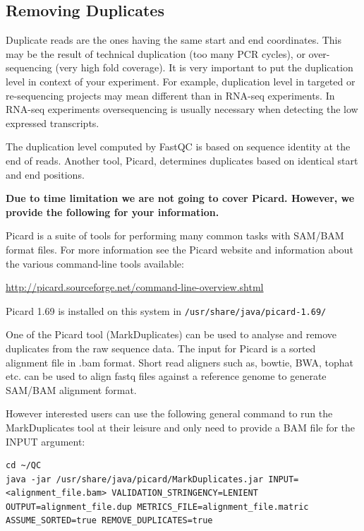 \begin{advanced}
\subsection{Removing Duplicates}
Duplicate reads are the ones having the same start and end coordinates. This
may be the result of technical duplication (too many PCR cycles), or
over-sequencing (very high fold coverage). It is very important to put the
duplication level in context of your experiment. For example, duplication level
in targeted or re-sequencing projects may mean different than in RNA-seq
experiments. In RNA-seq experiments oversequencing is usually necessary when
detecting the low expressed transcripts.

\begin{information}
The duplication level computed by FastQC is based on sequence identity at the
end of reads. Another tool, Picard, determines duplicates based on identical
start and end positions.

\textbf{Due to time limitation we are not going to cover Picard. However, we
provide the following for your information.}

Picard is a suite of tools for performing many common tasks with SAM/BAM format
files. For more information see the Picard website and information about the
various command-line tools available:

\url{http://picard.sourceforge.net/command-line-overview.shtml}
\end{information}

\begin{information}
Picard 1.69 is installed on this system in \texttt{/usr/share/java/picard-1.69/}

One of the Picard tool (MarkDuplicates) can be used to analyse and remove
duplicates from the raw sequence data. The input for Picard is a sorted
alignment file in .bam format. Short read aligners such as, bowtie, BWA, tophat
etc. can be used to align fastq files against a reference genome to generate
SAM/BAM alignment format.
\end{information}

\begin{steps}
However interested users can use the following general command to run the
MarkDuplicates tool at their leisure and only need to provide a BAM file for the
INPUT argument:

\begin{lstlisting}
cd ~/QC
java -jar /usr/share/java/picard/MarkDuplicates.jar INPUT=<alignment_file.bam> VALIDATION_STRINGENCY=LENIENT OUTPUT=alignment_file.dup METRICS_FILE=alignment_file.matric ASSUME_SORTED=true REMOVE_DUPLICATES=true

\end{lstlisting}
\end{steps}

\end{advanced}

